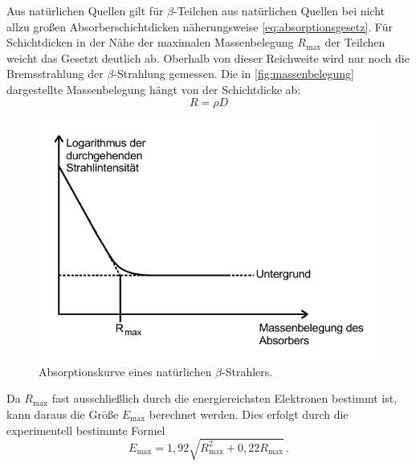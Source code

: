 Aus natürlichen Quellen gilt für $\beta$-Teilchen aus natürlichen Quellen 
bei nicht allzu großen Absorberschichtdicken näherungsweise \autoref{eq:absorptionsgesetz}. 
Für Schichtdicken in der Nähe der maximalen Massenbelegung $R_\text{max}$ der Teilchen weicht das Gesetzt deutlich ab. 
Oberhalb von dieser Reichweite wird nur noch die Bremsstrahlung der $\beta$-Strahlung gemessen.
Die in \autoref{fig:massenbelegung} dargestellte Massenbelegung hängt von der Schichtdicke ab:
\begin{equation}
    R = \rho D
\end{equation}
\begin{figure}
    \centering
    \includegraphics[width=0.6\linewidth]{pictures/massenbelegung.pdf}
    \caption{Absorptionskurve eines natürlichen $\beta$-Strahlers. \cite{v704}}
    \label{fig:massenbelegung}
\end{figure}
Da $R_\text{max}$ fast ausschließlich durch die energiereichsten Elektronen bestimmt ist, kann
daraus die Größe $E_\text{max}$ berechnet werden. 
Dies erfolgt durch die experimentell bestimmte Formel
\begin{equation} \label{eq:Emax}
    E_\text{max}= 1,92 \sqrt{R_\text{max}^{2}+ 0,22 R_\text{max}} \, .
\end{equation}